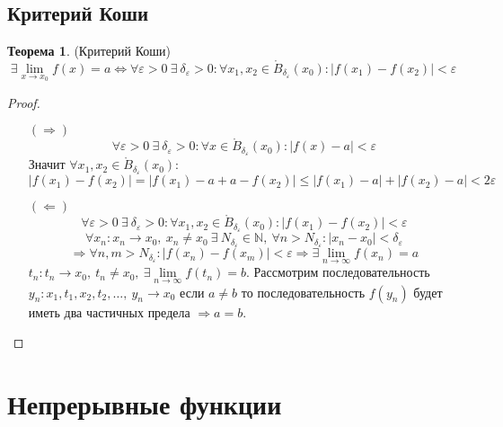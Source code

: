 \documentclass[a4paper, 12pt]{article}
\newcommand{\N}{\mathbb{N}}
\newcommand{\Bo}{\mathring{B}}
\renewcommand{\epsilon}{\varepsilon}
\newcommand\tab[1][.5cm]{\hspace*{#1}}
\newcommand{\lims}{\lim\limits_{n\to \infty}}
\theoremstyle{definition}
\newtheorem*{theorem}{Теорема}
\begin{document}
    \subsection{Критерий Коши}
        \begin{theorem} (Критерий Коши)
            \[\exists \lim\limits_{x\to x_0}f(x)=a \Leftrightarrow \forall \epsilon>0\ \exists\ \delta_{\epsilon}>0: \forall x_1,x_2\in \Bo_{\delta_{\epsilon}}(x_0): |f(x_1)-f(x_2)|<\epsilon\]
        \end{theorem} 
        \begin{proof}\tab
            \begin{itemize}
                \item[$(\Rightarrow)$] \[\forall \epsilon>0\ \exists\ \delta_{\epsilon}>0: \forall x\in \Bo_{\delta_{\epsilon}}(x_0): |f(x)-a|<\epsilon\]
                Значит $\forall x_1,x_2\in \Bo_{\delta_{\epsilon}}(x_0):$
                \[|f(x_1)-f(x_2)|=|f(x_1)-a+a-f(x_2)|\leq|f(x_1)-a|+|f(x_2)-a|<2\epsilon\]
                \item[$(\Leftarrow)$] \[\forall \epsilon>0\ \exists\ \delta_{\epsilon}>0: \forall x_1,x_2\in \Bo_{\delta_{\epsilon}}(x_0): |f(x_1)-f(x_2)|<\epsilon\]
                \[\forall x_n: x_n\to x_0,\ x_n\ne x_0\ \exists\ N_{\delta_{\epsilon}}\in \N,\ \forall n> N_{\delta_{\epsilon}}: |x_n-x_0|<\delta_{\epsilon}\]
                \[\Rightarrow \forall n,m>N_{\delta_{\epsilon}}: |f(x_n)-f(x_m)|<\epsilon \Rightarrow \exists\lims f(x_n)=a\]
                $t_n: t_n\to x_0,\ t_n\ne x_0,\ \exists \lims f(t_n)=b$. Рассмотрим последовательность $y_n: x_1, t_1, x_2, t_2, \dots,\ y_n\to x_0$ если $a\ne b$ то последовательность $f(y_n)$  будет иметь два частичных предела $\Rightarrow a=b$.
            \end{itemize}
        \end{proof} 
    \newpage
    \section{Непрерывные функции}
\end{document}
